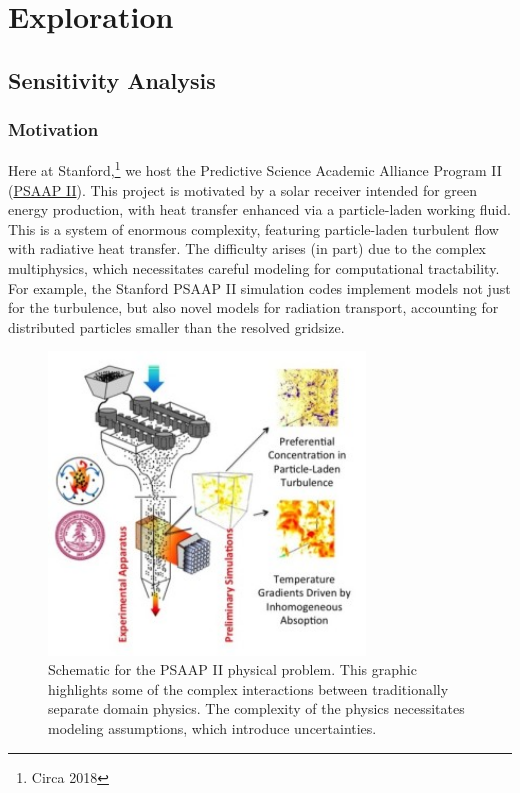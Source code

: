 \documentclass[../primer.tex]{subfiles}
\begin{document}
\chapter{Exploration}

\section{Sensitivity Analysis}
\subsection{Motivation} \label{sec:orgdc914a7}
Here at Stanford,\footnote{Circa 2018} we host the Predictive Science Academic
Alliance Program II
(\href{http://exascale.stanford.edu/content/stanford-psaap-ii-motivation-1}{PSAAP
  II}). This project is motivated by a solar receiver intended for green energy
production, with heat transfer enhanced via a particle-laden working fluid. This
is a system of enormous complexity, featuring particle-laden turbulent flow with
radiative heat transfer. The difficulty arises (in part) due to the complex
multiphysics, which necessitates careful modeling for computational
tractability. For example, the Stanford PSAAP II simulation codes implement
models not just for the turbulence, but also novel models for radiation
transport, accounting for distributed particles smaller than the resolved
gridsize.

\begin{figure}[!ht]
  \centering
  \includegraphics[width=0.75\textwidth]{./images/psaap}
  \caption{Schematic for the PSAAP II physical problem. This graphic
    highlights some of the complex interactions between traditionally
    separate domain physics. The complexity of the physics necessitates
    modeling assumptions, which introduce uncertainties.}
  \label{fig:psaap}
\end{figure}
\end{document}
